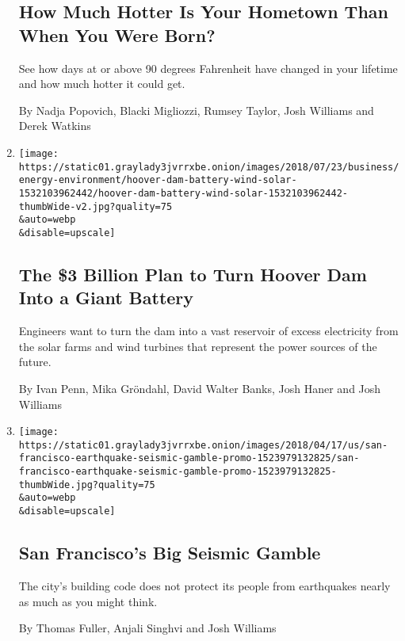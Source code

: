 \begin{enumerate}
  \hypertarget{how-much-hotter-is-your-hometown-than-when-you-were-born}{%
  \subsection{How Much Hotter Is Your Hometown Than When You Were
  Born?}\label{how-much-hotter-is-your-hometown-than-when-you-were-born}}

  See how days at or above 90 degrees Fahrenheit have changed in your
  lifetime and how much hotter it could get.

  By Nadja Popovich, Blacki Migliozzi, Rumsey Taylor, Josh Williams and
  Derek Watkins
\item
  \href{/interactive/2018/07/24/business/energy-environment/hoover-dam-renewable-energy.html}{}

  \texttt{[image: https://static01.graylady3jvrrxbe.onion/images/2018/07/23/business/energy-environment/hoover-dam-battery-wind-solar-1532103962442/hoover-dam-battery-wind-solar-1532103962442-thumbWide-v2.jpg?quality=75\\\&auto=webp\\\&disable=upscale]}

  \hypertarget{the-3-billion-plan-to-turn-hoover-dam-into-a-giant-battery}{%
  \subsection{The \$3 Billion Plan to Turn Hoover Dam Into a Giant
  Battery}\label{the-3-billion-plan-to-turn-hoover-dam-into-a-giant-battery}}

  Engineers want to turn the dam into a vast reservoir of excess
  electricity from the solar farms and wind turbines that represent the
  power sources of the future.

  By Ivan Penn, Mika Gröndahl, David Walter Banks, Josh Haner and Josh
  Williams
\item
  \href{/interactive/2018/04/17/us/san-francisco-earthquake-seismic-gamble.html}{}

  \texttt{[image: https://static01.graylady3jvrrxbe.onion/images/2018/04/17/us/san-francisco-earthquake-seismic-gamble-promo-1523979132825/san-francisco-earthquake-seismic-gamble-promo-1523979132825-thumbWide.jpg?quality=75\\\&auto=webp\\\&disable=upscale]}

  \hypertarget{san-franciscos-big-seismic-gamble}{%
  \subsection{San Francisco's Big Seismic
  Gamble}\label{san-franciscos-big-seismic-gamble}}

  The city's building code does not protect its people from earthquakes
  nearly as much as you might think.

  By Thomas Fuller, Anjali Singhvi and Josh Williams
\end{enumerate}

